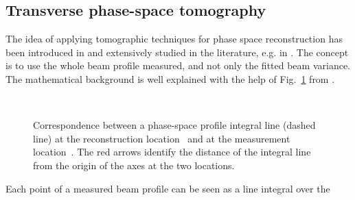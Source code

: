 \subsection{Transverse phase-space tomography \label{QuadScanTomo}}
%
The idea of applying tomographic techniques for phase space reconstruction
has been introduced in \cite{McKee1995} and extensively studied in the
literature, e.g. in \cite{Lohl2005, Hock2011}.
The concept is to use the whole beam profile measured, and not only the
fitted beam variance. 
The mathematical background is well explained with the help of
Fig.~\ref{fig:tomoPhaseSpaces} from \cite{Hock2011}.
%
\begin{figure}
\centering
{}
\,
%
\caption{
Correspondence between a phase-space profile integral line (dashed line) at the reconstruction location~\protect{} and at the measurement location~\protect{}.
The red arrows identify the distance of the integral line from the origin of the axes at the two locations.
}
\label{fig:tomoPhaseSpaces}
\end{figure}
%
Each point of a measured beam profile can be seen as a line integral over the
